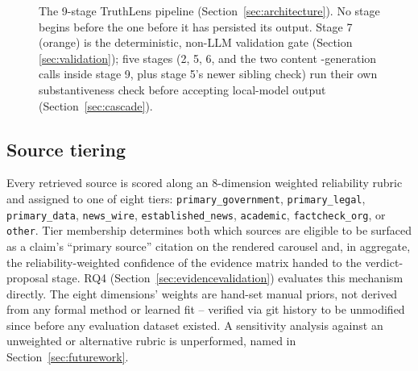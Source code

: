 \documentclass[conference]{IEEEtran}
\begin{document}
\begin{figure}[!t]
\centering
{}
\caption{The 9-stage TruthLens pipeline (Section~\ref{sec:architecture}).
No stage begins before the one before it has persisted its output. Stage 7
(orange) is the deterministic, non-LLM validation gate (Section
\ref{sec:validation}); five stages (2, 5, 6, and the two content
-generation calls inside stage 9, plus stage 5's newer sibling check) run
their own substantiveness check before accepting local-model output
(Section~\ref{sec:cascade}).}
\label{fig:architecture}
\end{figure}

\subsection{Source tiering}
Every retrieved source is scored along an 8-dimension weighted reliability
rubric and assigned to one of eight tiers: \texttt{primary\_government},
\texttt{primary\_legal}, \texttt{primary\_data}, \texttt{news\_wire},
\texttt{established\_news}, \texttt{academic}, \texttt{factcheck\_org}, or
\texttt{other}. Tier membership determines both which sources are eligible
to be surfaced as a claim's ``primary source'' citation on the rendered
carousel and, in aggregate, the reliability-weighted confidence of the
evidence matrix handed to the verdict-proposal stage. RQ4
(Section~\ref{sec:evidencevalidation}) evaluates this mechanism directly.
The eight dimensions' weights are hand-set manual priors, not derived
from any formal method or learned fit -- verified via git history to be
unmodified since before any evaluation dataset existed. A sensitivity
analysis against an unweighted or alternative rubric is unperformed,
named in Section~\ref{sec:futurework}.
\end{document}

